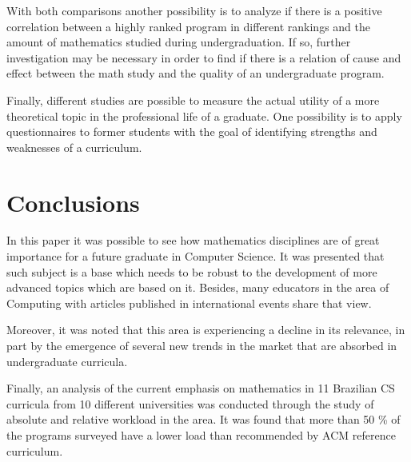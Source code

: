 \documentclass[conference]{IEEEtran}
\begin{document}
	With both comparisons another possibility is to analyze if there is a positive correlation between a highly ranked program in different rankings and the amount of mathematics studied during undergraduation. If so, further investigation may be necessary in order to find if there is a relation of cause and effect between the math study and the quality of an undergraduate program.
	
	Finally, different studies are possible to measure the actual utility of a more theoretical topic in the professional life of a graduate. One possibility is to apply questionnaires to former students with the goal of identifying strengths and weaknesses of a curriculum.
	
	
\section{Conclusions}
	In this paper it was possible to see how mathematics disciplines are of great importance for a future graduate in Computer Science. It was presented that such subject is a base which needs to be robust to the development of more advanced topics which are based on it. Besides, many educators in the area of Computing with articles published in international events share that view.

	Moreover, it was noted that this area is experiencing a decline in its relevance, in part by the emergence of several new trends in the market that are absorbed in undergraduate curricula.
	
	Finally, an analysis of the current emphasis on mathematics in 11 Brazilian CS curricula from 10 different universities was conducted through the study of absolute and relative workload in the area. It was found that more than 50 \% of the programs surveyed have a lower load than recommended by ACM reference curriculum.
	
%
%
\end{document}
